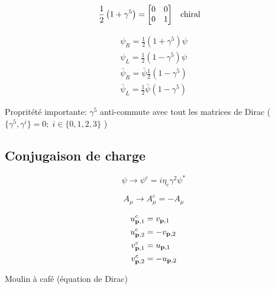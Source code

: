 \[ \frac{1}{2} \left( 1 + \gamma^{5} \right)  =\mqty[0 &0 \\ 0 &1] \qq{chiral}\]

\begin{align*}
	\psi_R = \frac{1}{2} \left( 1 + \gamma^5 \right) \psi	\\
	\psi_L = \frac{1}{2} \left( 1 -\gamma^5 \right) \psi \\
	\bar\psi_R = \bar \psi \frac{1}{2} \left( 1 - \gamma^5 \right)	\\
	\bar\psi_L = \frac{1}{2} \bar\psi \left( 1 -\gamma^5 \right)
\end{align*}

Propritété importante: $\gamma^{5}$ anti-commute avec tout les matrices de Dirac ( $\{\gamma^{5}, \gamma^i\} =0;\; i \in \{ 0,1,2,3 \} $ ) 

\subsection*{Conjugaison de charge}

\[ \psi \to \psi^{c} =  i \eta_c \gamma^{2}\psi ^{*} \]

\[ A_{\mu}  \to A_{\mu} ^{c}= - A_\mu \]


\begin{align*}
	u_{\vb{p},1} ^ c &= v_{\vb{p},1} \\
u_{\vb{p},2}^c &= - v_{\vb{p},2} \\
v_{\vb{p},1} ^c &= u_{\vb{p},1} \\ 
v_{\vb{p},2}^c &= - u_{\vb{p},2}  
\end{align*}


Moulin à café (équation de Dirac)








